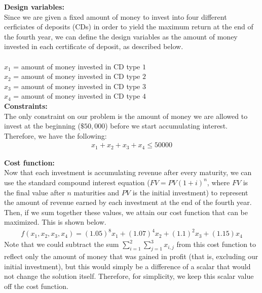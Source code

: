 \documentclass[11pt]{article}
\begin{document}
\begin{prob}{3}
\end{prob}

\begin{sol}

\textbf{Design variables:} \\ 
Since we are given a fixed amount of money to invest into four different cerficiates of deposits (CDs) in order to yield the maximum return at the end of the fourth year, we can define the design variables as the amount of money invested in each certificate of deposit, as described below.\\ \\ 
$x_{1}$ = amount of money invested in CD type $1$ \\
$x_{2}$ = amount of money invested in CD type $2$ \\
$x_{3}$ = amount of money invested in CD type $3$ \\
$x_{4}$ = amount of money invested in CD type $4$ \\

\textbf{Constraints:}  \\
The only constraint on our problem is the amount of money we are allowed to invest at the beginning ($\$50,000$) before we start accumulating interest. Therefore, we have the following:
\begin{eqnarray*}
x_{1} + x_{2} + x_{3} + x_{4} \leq 50000
\end{eqnarray*}

\textbf{Cost function:} \\
Now that each investment is accumulating revenue after every maturity, we can use the standard compound interest equation ($FV = PV(1+i)^{n}$, where $FV$ is the final value after $n$ maturities and $PV$ is the initial investment) to represent the amount of revenue earned by each investment at the end of the fourth year. Then, if we sum together these values, we attain our cost function that can be maximized. This is shown below.
\begin{eqnarray*}
f(x_{1}, x_{2}, x_{3}, x_{4}) = (1.05)^{8}x_{1} + (1.07)^{4}x_{2} + (1.1)^{2}x_{3} + (1.15)x_{4}
\end{eqnarray*}
Note that we could subtract the sum $\sum_{i=1}^{2}\sum_{j=1}^{3}x_{i,j}$ from this cost function to reflect only the amount of money that was gained in profit (that is, excluding our initial investment), but this would simply be a difference of a scalar that would not change the solution itself. Therefore, for simplicity, we keep this scalar value off the cost function. \\


\end{sol}
\end{document}
